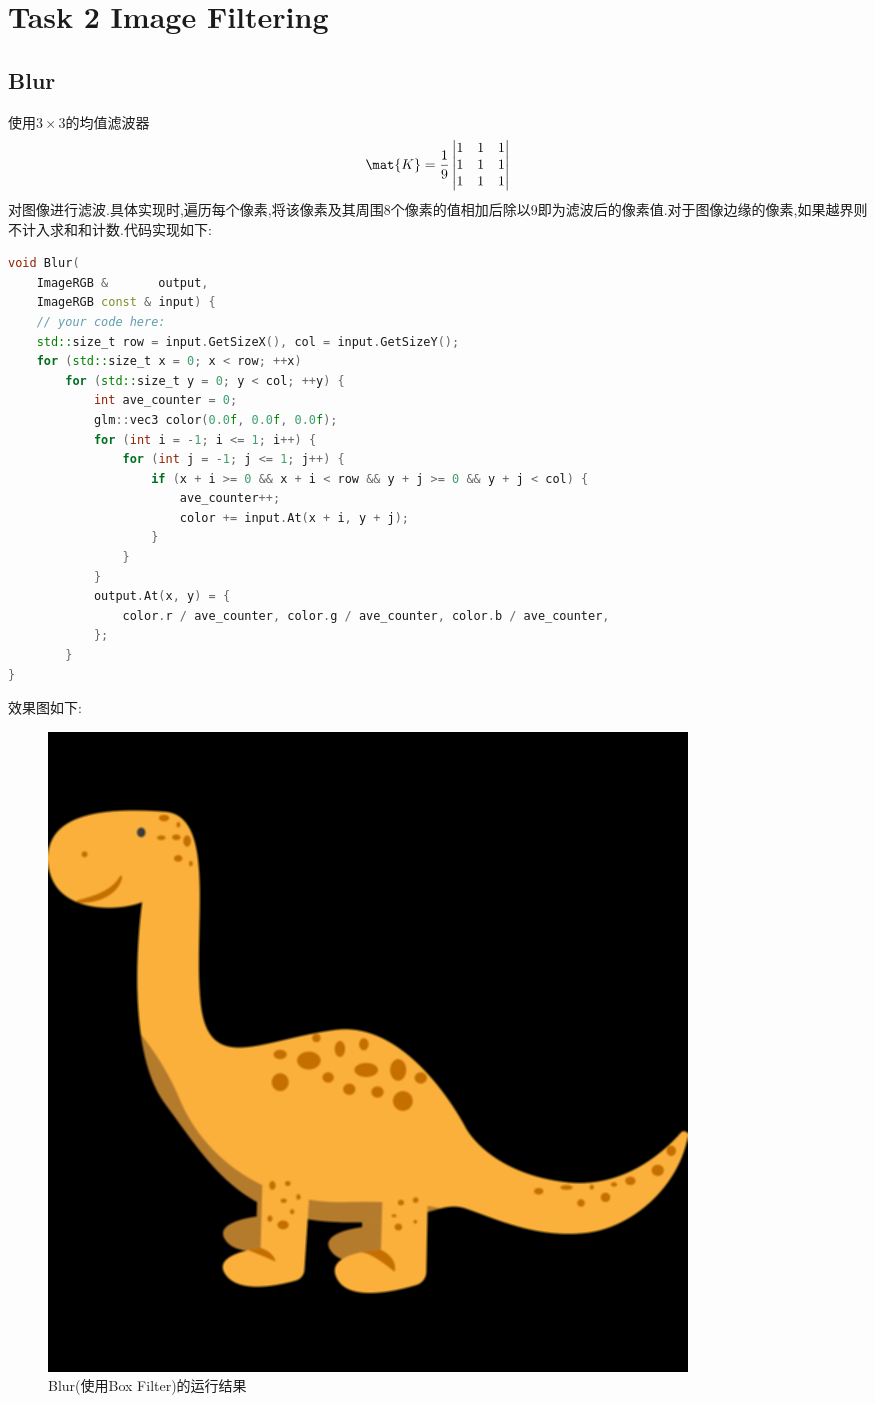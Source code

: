 \documentclass{ctexart}
\begin{document}
\section*{Task 2 Image Filtering}
\subsection*{Blur}
使用$3\times3$的均值滤波器
\[\mat{K}=\dfrac19\begin{vmatrix}
    1&1&1\\
    1&1&1\\
    1&1&1
\end{vmatrix}\]
对图像进行滤波.具体实现时,遍历每个像素,将该像素及其周围8个像素的值相加后除以9即为滤波后的像素值.对于图像边缘的像素,如果越界则不计入求和和计数.代码实现如下:
\begin{lstlisting}[language=C++]
void Blur(
    ImageRGB &       output,
    ImageRGB const & input) {
    // your code here:
    std::size_t row = input.GetSizeX(), col = input.GetSizeY();
    for (std::size_t x = 0; x < row; ++x)
        for (std::size_t y = 0; y < col; ++y) {
            int ave_counter = 0;
            glm::vec3 color(0.0f, 0.0f, 0.0f);
            for (int i = -1; i <= 1; i++) {
                for (int j = -1; j <= 1; j++) {
                    if (x + i >= 0 && x + i < row && y + j >= 0 && y + j < col) {
                        ave_counter++;
                        color += input.At(x + i, y + j);
                    }
                }
            }
            output.At(x, y) = {
                color.r / ave_counter, color.g / ave_counter, color.b / ave_counter,
            };
        }
}
\end{lstlisting}
效果图如下:
\begin{figure}[H]
    \centering\includegraphics[scale=0.4]{figure/Blur.png}
    \caption{Blur(使用Box Filter)的运行结果}
\end{figure}
\end{document}
